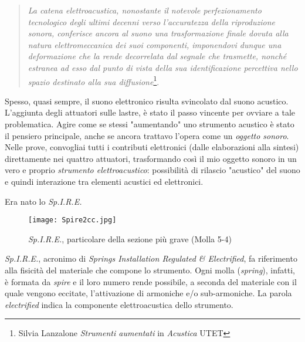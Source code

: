 \begin{quotation}
\textit{La catena elettroacustica, nonostante il notevole perfezionamento tecnologico degli ultimi decenni verso l'accuratezza della riproduzione sonora, conferisce ancora al suono una trasformazione finale dovuta alla natura elettromeccanica dei suoi componenti, imponendovi dunque una deformazione che la rende decorrelata dal segnale che trasmette, nonché estranea ad esso dal punto di vista della sua identificazione percettiva nello spazio destinato alla sua diffusione}\footnote{Silvia Lanzalone \textit{Strumenti aumentati} in \textit{Acustica} UTET}.
\end{quotation}

Spesso, quasi sempre, il suono elettronico risulta svincolato dal suono acustico. L'aggiunta degli attuatori sulle lastre, è stato il passo vincente per ovviare a tale problematica. Agire come se stessi "aumentando" uno strumento acustico è stato il pensiero principale, anche se ancora trattavo l'opera come un \textit{oggetto sonoro}. Nelle prove, convogliai tutti i contributi elettronici (dalle elaborazioni alla sintesi) direttamente nei quattro attuatori,  trasformando così il mio oggetto sonoro in un vero e proprio \textit{strumento elettroacustico}: possibilità di rilascio "acustico" del suono e quindi interazione tra elementi acustici ed elettronici. 

Era nato lo \textit{Sp.I.R.E.}


\begin{figure}[htbp]
\begin{center}
\texttt{[image: Spire2cc.jpg]}
\caption{\textit{Sp.I.R.E.}, particolare della sezione più grave (Molla 5-4)}
\label{default}
\end{center}
\end{figure}

\textit{Sp.I.R.E.}, acronimo di \textit{Springs Installation Regulated \& Electrified}, fa riferimento alla fisicità del materiale che compone lo strumento. Ogni molla (\textit{spring}), infatti, è formata da \textit{spire} e il loro numero rende possibile, a seconda del materiale con il quale vengono eccitate, l'attivazione di armoniche e/o sub-armoniche. La parola \textit{electrified} indica la componente elettroacustica dello strumento.

